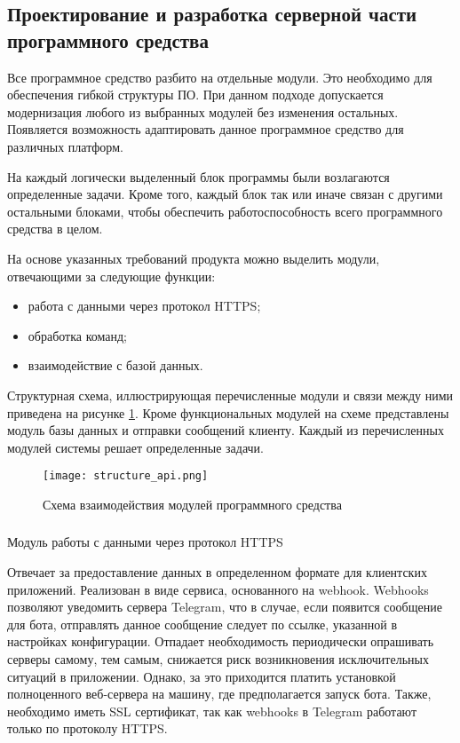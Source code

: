 \subsection{Проектирование и разработка серверной части программного средства}
\label{sec:design:server}

Все программное средство разбито на отдельные модули. Это
необходимо для обеспечения гибкой структуры ПО. При данном подходе
допускается модернизация любого из выбранных модулей без изменения
остальных. Появляется возможность адаптировать данное программное
средство для различных платформ.

На каждый логически выделенный блок программы были возлагаются
определенные задачи. Кроме того, каждый блок так или иначе связан с
другими остальными блоками, чтобы обеспечить работоспособность всего
программного средства в целом.

На основе указанных требований продукта можно выделить модули, отвечающими за следующие функции:

\begin{itemize}
	\item работа с данными через протокол HTTPS;
	\item обработка команд;
	\item взаимодействие с базой данных.
\end{itemize}

Структурная схема, иллюстрирующая перечисленные модули и связи
между ними приведена на рисунке \ref{fig:design:architecture:structure_api}. Кроме функциональных модулей на
схеме представлены модуль базы данных и отправки сообщений клиенту.
Каждый из перечисленных модулей системы решает определенные задачи.

\begin{figure}[!h]
\centering
	\texttt{[image: structure\_api.png]}
	\caption{Схема взаимодействия модулей программного средства}
	\label{fig:design:architecture:structure_api}
\end{figure}
\subsubsection{} Модуль работы с данными через протокол HTTPS
\label{sec:design:server:api}

Отвечает за предоставление данных в определенном формате для клиентских приложений. Реализован в виде сервиса, основанного на \linebreak webhook. Webhooks позволяют уведомить сервера Telegram, что в случае, если появится сообщение для бота, отправлять данное сообщение следует по ссылке, указанной в настройках конфигурации. Отпадает необходимость периодически опрашивать серверы самому, тем самым, снижается риск возникновения исключительных ситуаций в приложении. Однако, за это приходится платить установкой полноценного веб-сервера на машину, где предполагается запуск бота. Также, необходимо иметь SSL сертификат, так как webhooks в Telegram работают только по протоколу HTTPS.

